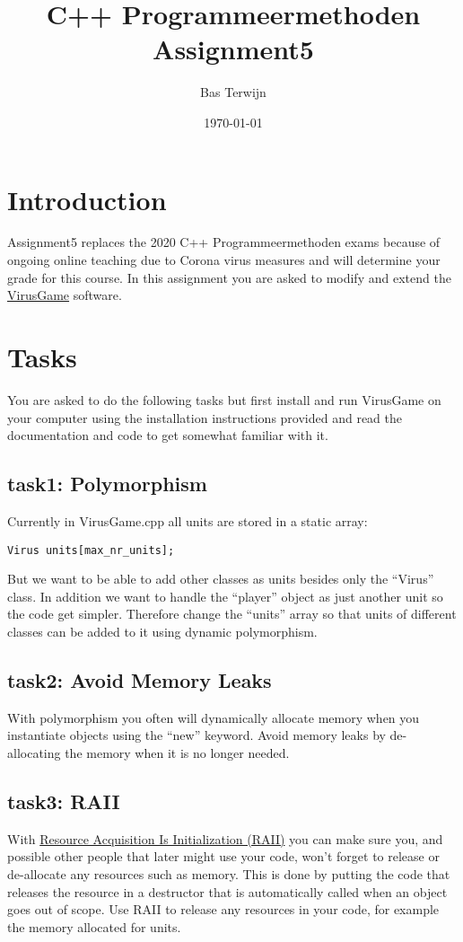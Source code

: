 \documentclass[12pt]{article}
\title{C++ Programmeermethoden Assignment5}
\author{Bas Terwijn}
\date{\today}
\begin{document}
\maketitle

\section{Introduction}
Assignment5 replaces the 2020 C++ Programmeermethoden exams because of
ongoing online teaching due to Corona virus measures and will
determine your grade for this course. In this assignment you are asked
to modify and extend the
\href{https://bitbucket.org/bterwijn/virusgame}{VirusGame} software.

\section{Tasks}
You are asked to do the following tasks but first install and run
VirusGame on your computer using the installation instructions
provided and read the documentation and code to get somewhat
familiar with it.

\subsection{task1: Polymorphism}
Currently in VirusGame.cpp all units are stored in a static array:

\begin{tcolorbox}
\begin{verbatim}
Virus units[max_nr_units];
\end{verbatim}
\end{tcolorbox}

But we want to be able to add other classes as units besides only the
``Virus'' class. In addition we want to handle the ``player'' object as
just another unit so the code get simpler. Therefore change the
``units'' array so that units of different classes can be added to it
using dynamic polymorphism.

\subsection{task2: Avoid Memory Leaks}
With polymorphism you often will dynamically allocate memory when you
instantiate objects using the ``new'' keyword. Avoid memory leaks by
de-allocating the memory when it is no longer needed.

\subsection{task3: RAII}
With \href{https://en.cppreference.com/w/cpp/language/raii}{Resource
  Acquisition Is Initialization (RAII)} you can make sure you, and
possible other people that later might use your code, won't forget to
release or de-allocate any resources such as memory. This is done by
putting the code that releases the resource in a destructor that is
automatically called when an object goes out of scope. Use RAII to
release any resources in your code, for example the memory allocated
for units.
\end{document}
